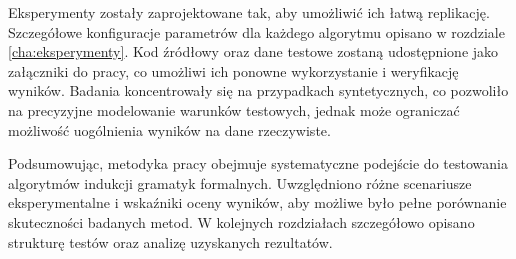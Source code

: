 Eksperymenty zostały zaprojektowane tak, aby umożliwić ich łatwą replikację. Szczegółowe konfiguracje parametrów dla każdego algorytmu opisano w rozdziale \ref{cha:eksperymenty}. Kod źródłowy oraz dane testowe zostaną udostępnione jako załączniki do pracy, co umożliwi ich ponowne wykorzystanie i weryfikację wyników. Badania koncentrowały się na przypadkach syntetycznych, co pozwoliło na precyzyjne modelowanie warunków testowych, jednak może ograniczać możliwość uogólnienia wyników na dane rzeczywiste.

Podsumowując, metodyka pracy obejmuje systematyczne podejście do testowania algorytmów indukcji gramatyk formalnych. Uwzględniono różne scenariusze eksperymentalne i wskaźniki oceny wyników, aby możliwe było pełne porównanie skuteczności badanych metod. W kolejnych rozdziałach szczegółowo opisano strukturę testów oraz analizę uzyskanych rezultatów.
